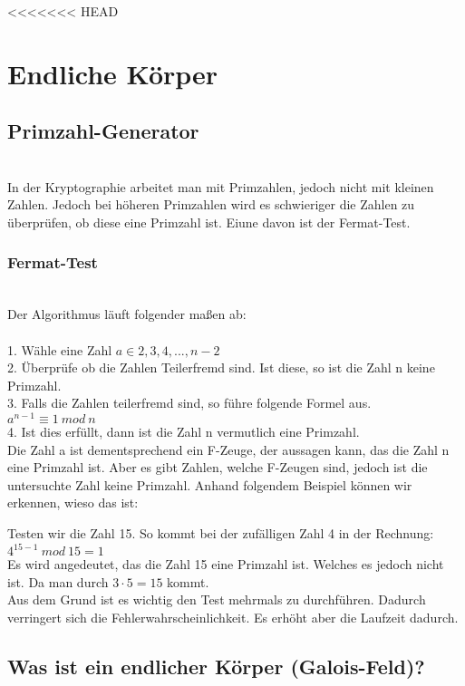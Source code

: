<<<<<<< HEAD
\chapter{Endliche Körper}

\section{Primzahl-Generator}
\\
In der Kryptographie arbeitet man mit Primzahlen, jedoch nicht mit kleinen Zahlen.
Jedoch bei höheren Primzahlen wird es schwieriger die Zahlen zu überprüfen, ob diese eine Primzahl ist.
Eiune davon ist der Fermat-Test.

\subsection{Fermat-Test}
\\
Der Algorithmus läuft folgender maßen ab:\\
\\
1. Wähle eine Zahl $ a \in {2,3,4,...,n-2}$ \\
2. Überprüfe ob die Zahlen Teilerfremd sind. Ist diese, so ist die Zahl n keine Primzahl.\\
3. Falls die Zahlen teilerfremd sind, so führe folgende Formel aus.\\
$
a^{n-1} \equiv  1\ mod\ n
$\\
4. Ist dies erfüllt, dann ist die Zahl n vermutlich eine Primzahl. 
\\
Die Zahl a ist dementsprechend ein F-Zeuge, der aussagen kann, das die Zahl n eine Primzahl ist.
Aber es gibt Zahlen, welche F-Zeugen sind, jedoch ist die untersuchte Zahl keine Primzahl.
Anhand folgendem Beispiel können wir erkennen, wieso das ist:

Testen wir die Zahl 15. So kommt bei der zufälligen Zahl 4 in der Rechnung: \\
$
4^{15-1}\ mod\ 15 = 1
$\\
Es wird angedeutet, das die Zahl 15 eine Primzahl ist. Welches es jedoch nicht ist. Da man durch $3 \cdot 5 = 15$ kommt.\\
Aus dem Grund ist es wichtig den Test mehrmals zu durchführen. Dadurch verringert sich die Fehlerwahrscheinlichkeit. Es erhöht aber die Laufzeit dadurch.\\

\newpage
\section{Was ist ein endlicher Körper (Galois-Feld)?}\\
\\

